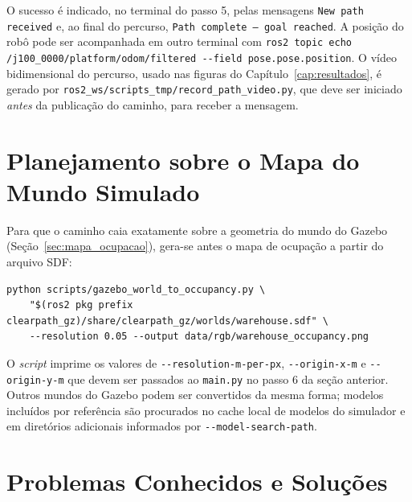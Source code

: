 \documentclass[
    12pt,
    openright,
    oneside,
    a4paper,
    english,
    brazil
]{abntex2}
\begin{document}
\begin{apendicesenv}
O sucesso é indicado, no terminal do passo 5, pelas mensagens \texttt{New path received} e, ao final do percurso, \texttt{Path complete -- goal reached}. A posição do robô pode ser acompanhada em outro terminal com \texttt{ros2 topic echo /j100\_0000/\allowbreak{}platform/\allowbreak{}odom/\allowbreak{}filtered -{}-field pose.pose.position}. O vídeo bidimensional do percurso, usado nas figuras do Capítulo~\ref{cap:resultados}, é gerado por \texttt{ros2\_ws/scripts\_tmp/record\_path\_video.py}, que deve ser iniciado \emph{antes} da publicação do caminho, para receber a mensagem.

\section{Planejamento sobre o Mapa do Mundo Simulado}

Para que o caminho caia exatamente sobre a geometria do mundo do Gazebo (Seção~\ref{sec:mapa_ocupacao}), gera-se antes o mapa de ocupação a partir do arquivo SDF:

\begin{lstlisting}[style=comandos]
python scripts/gazebo_world_to_occupancy.py \
    "$(ros2 pkg prefix clearpath_gz)/share/clearpath_gz/worlds/warehouse.sdf" \
    --resolution 0.05 --output data/rgb/warehouse_occupancy.png
\end{lstlisting}

O \textit{script} imprime os valores de \texttt{-{}-resolution-m-per-px}, \texttt{-{}-origin-x-m} e \texttt{-{}-origin-y-m} que devem ser passados ao \texttt{main.py} no passo 6 da seção anterior. Outros mundos do Gazebo podem ser convertidos da mesma forma; modelos incluídos por referência são procurados no cache local de modelos do simulador e em diretórios adicionais informados por \texttt{-{}-model-search-path}.

\section{Problemas Conhecidos e Soluções}


\end{apendicesenv}
\end{document}
